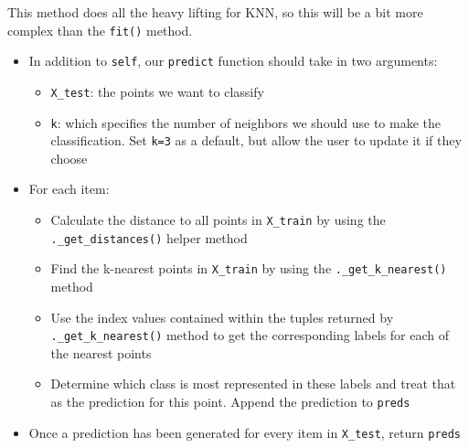 \documentclass[11pt]{article}
\providecommand{\tightlist}{%
      \setlength{\itemsep}{0pt}\setlength{\parskip}{0pt}}
\begin{document}
This method does all the heavy lifting for KNN, so this will be a bit
more complex than the \texttt{fit()} method.

\begin{itemize}
\tightlist
\item
  In addition to \texttt{self}, our \texttt{predict} function should
  take in two arguments:

  \begin{itemize}
  \tightlist
  \item
    \texttt{X\_test}: the points we want to classify
  \item
    \texttt{k}: which specifies the number of neighbors we should use to
    make the classification. Set \texttt{k=3} as a default, but allow
    the user to update it if they choose
  \end{itemize}
\item
  For each item:

  \begin{itemize}
  \tightlist
  \item
    Calculate the distance to all points in \texttt{X\_train} by using
    the \texttt{.\_get\_distances()} helper method
  \item
    Find the k-nearest points in \texttt{X\_train} by using the
    \texttt{.\_get\_k\_nearest()} method
  \item
    Use the index values contained within the tuples returned by
    \texttt{.\_get\_k\_nearest()} method to get the corresponding labels
    for each of the nearest points\\
  \item
    Determine which class is most represented in these labels and treat
    that as the prediction for this point. Append the prediction to
    \texttt{preds}
  \end{itemize}
\item
  Once a prediction has been generated for every item in
  \texttt{X\_test}, return \texttt{preds}
\end{itemize}
\end{document}
